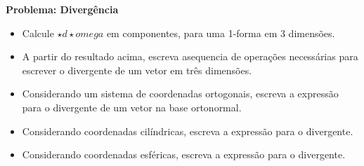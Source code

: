 \begin{framed}
\textbf{Problema: \textbf{Divergência}}\\
\begin{itemize}
\item Calcule $\star d \star omega$ em componentes, para uma 1-forma em 3 dimensões.
\item A partir do resultado acima, escreva asequencia de operações necessárias para escrever o divergente de um vetor em três dimensões.
\item Considerando um sistema de coordenadas ortogonais, escreva a expressão para o divergente de um vetor na base ortonormal.
\item Considerando coordenadas cilíndricas, escreva a expressão para o divergente.
\item Considerando coordenadas esféricas, escreva a expressão para o divergente.
\end{itemize}
\end{framed}

